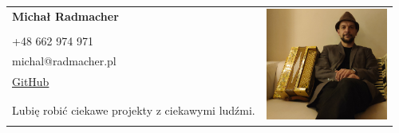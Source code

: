 \documentclass[a4paper]{article}
\begin{document}
\begin{tabular}{p{7cm}r}
\textbf{Michał Radmacher}&\multirow{10}{*}{\includegraphics[width=40mm]{mr.jpg}}\\
&\\
+48 662 974 971&\\
michal@radmacher.pl&\\
\href{https://github.com/mradmacher/}{GitHub}\\
&\\
&\\
Lubię robić ciekawe projekty z ciekawymi ludźmi.
&\\
&
\end{tabular}

\subsection*{}
\end{document}
